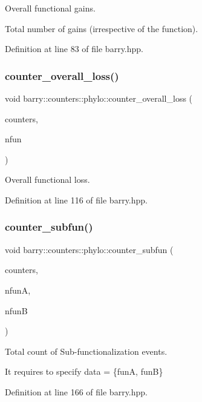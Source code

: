 Overall functional gains. 

Total number of gains (irrespective of the function). 

Definition at line 83 of file barry.\+hpp.

\mbox{\label{namespacebarry_1_1counters_1_1phylo_a45ae9af92d4821d218c99eaddaa9471e}} 
\subsubsection{\texorpdfstring{counter\+\_\+overall\+\_\+loss()}{counter\_overall\_loss()}}
{\footnotesize\ttfamily void barry\+::counters\+::phylo\+::counter\+\_\+overall\+\_\+loss (\begin{DoxyParamCaption}\item[{\hyperlink{namespacebarry_1_1counters_1_1phylo_a2f117d1cd1dff67e1539cbc0aef5766a}{Phylo\+Counter\+Vector} $\ast$}]{counters,  }\item[{\hyperlink{namespacebarry_a11dfc53ddb4672278319aa04f1e09a6c}{uint}}]{nfun }\end{DoxyParamCaption})\hspace{0.3cm}{\ttfamily [inline]}}



Overall functional loss. 



Definition at line 116 of file barry.\+hpp.

\mbox{\label{namespacebarry_1_1counters_1_1phylo_a1e4ae98fb2aea199150308431518c4bf}} 
\subsubsection{\texorpdfstring{counter\+\_\+subfun()}{counter\_subfun()}}
{\footnotesize\ttfamily void barry\+::counters\+::phylo\+::counter\+\_\+subfun (\begin{DoxyParamCaption}\item[{\hyperlink{namespacebarry_1_1counters_1_1phylo_a2f117d1cd1dff67e1539cbc0aef5766a}{Phylo\+Counter\+Vector} $\ast$}]{counters,  }\item[{\hyperlink{namespacebarry_a11dfc53ddb4672278319aa04f1e09a6c}{uint}}]{nfunA,  }\item[{\hyperlink{namespacebarry_a11dfc53ddb4672278319aa04f1e09a6c}{uint}}]{nfunB }\end{DoxyParamCaption})\hspace{0.3cm}{\ttfamily [inline]}}



Total count of Sub-\/functionalization events. 

It requires to specify data = \{funA, funB\} 

Definition at line 166 of file barry.\+hpp.

